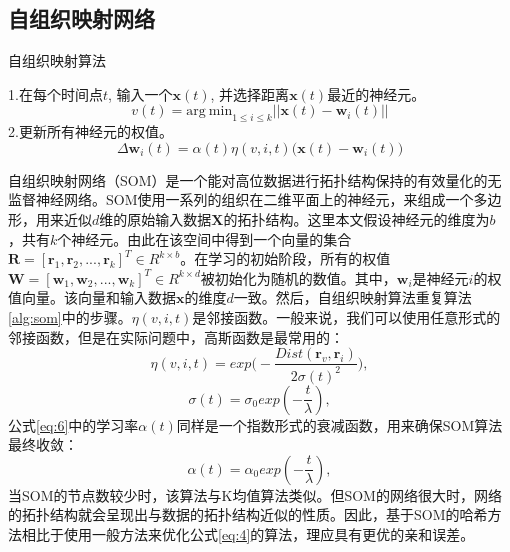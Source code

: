\subsection{自组织映射网络}
\begin{algorithm}[tb]
	\caption{自组织映射算法}
	\label{alg:som}
	\begin{algorithmic}
		\Repeat
		\State 1.在每个时间点$t$, 输入一个$\mathbf{x}(t)$, 并选择距离$\mathbf{x}(t)$最近的神经元。
		\begin{equation}\label{eq:5}
		v(t) = \mathrm{arg\ min}_{1 \leq i \leq k} || \mathbf{x}(t) - \mathbf{w}_{i}(t)||
		\end{equation}
		\State 2.更新所有神经元的权值。
		\begin{equation}\label{eq:6}
		\Delta\mathbf{w}_{i}(t) = \alpha(t)\eta(v, i, t)\big(\mathbf{x}(t) - \mathbf{w}_{i}(t)\big)
		\end{equation}
	\end{algorithmic}
\end{algorithm}
自组织映射网络（SOM）是一个能对高位数据进行拓扑结构保持的有效量化的无监督神经网络。SOM使用一系列的组织在二维平面上的神经元，来组成一个多边形，用来近似$d$维的原始输入数据$\mathbf{X}$的拓扑结构。这里本文假设神经元的维度为$b$ ，共有$k$个神经元。由此在该空间中得到一个向量的集合$\mathbf{R} = [\mathbf{r}_{1},  \mathbf{r}_{2}, ..., \mathbf{r}_{k}]^{T} \in R^{k\times b}$。在学习的初始阶段，所有的权值$\mathbf{W} = [\mathbf{w}_{1},  \mathbf{w}_{2}, ..., \mathbf{w}_{k}]^{T} \in R^{k\times d}$被初始化为随机的数值。其中，$\mathbf{w}_{i}$是神经元$i$的权值向量。该向量和输入数据$\mathbf{x}$的维度$d$一致。然后，自组织映射算法重复算法\ref{alg:som}中的步骤。$\eta(v, i, t)$是邻接函数。一般来说，我们可以使用任意形式的邻接函数，但是在实际问题中，高斯函数是最常用的：
\begin{equation}\label{eq:7}
\eta(v, i, t) = exp\Big(-\frac{Dist(\mathbf{r}_{v} , \mathbf{r}_{i})}{2\sigma(t)^{2}}\Big),
\end{equation}
\begin{equation}\label{eq:8}
\sigma(t) = \sigma_{0}exp(-\frac{t}{\lambda}),
\end{equation}
公式\ref{eq:6}中的学习率$\alpha(t)$同样是一个指数形式的衰减函数，用来确保SOM算法最终收敛：
\begin{equation}\label{eq:9}
\alpha(t) = \alpha_{0}exp(-\frac{t}{\lambda}),
\end{equation}
当SOM的节点数较少时，该算法与K均值算法类似。但SOM的网络很大时，网络的拓扑结构就会呈现出与数据的拓扑结构近似的性质。因此，基于SOM的哈希方法相比于使用一般方法来优化公式\ref{eq:4}的算法，理应具有更优的亲和误差。

